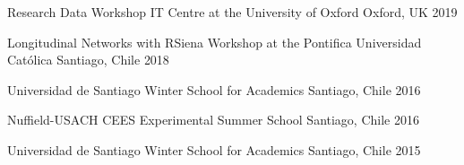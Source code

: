 






\begin{cvhonors}
\cvconf
{Research Data Workshop IT Centre at the University of Oxford} 
{Oxford, UK}
{2019}
\end{cvhonors}

\vspace{1mm}

\begin{cvhonors}
\cvconf
{Longitudinal Networks with RSiena Workshop at the Pontifica Universidad Cat\'olica}
{Santiago, Chile}
{2018}
\end{cvhonors}

\vspace{1mm}

\begin{cvhonors}
\cvconf
{Universidad de Santiago Winter School for Academics}
{Santiago, Chile}
{2016}
\end{cvhonors}

\vspace{1mm}

\begin{cvhonors}
\cvconf
{Nuffield-USACH CEES Experimental Summer School}
{Santiago, Chile}
{2016}
\end{cvhonors}

\vspace{1mm}

\begin{cvhonors}
\cvconf
{Universidad de Santiago Winter School for Academics}
{Santiago, Chile}
{2015}
\end{cvhonors}

